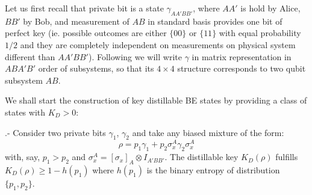\documentclass[twocolumn,prl,aps]{revtex4}
\begin{document}

Let us first recall that private bit \cite{keyhuge} is  a state 
$\gamma_{AA'BB'}$, where $AA'$ is hold by Alice, $BB'$ by Bob, 
and measurement of $AB$ in standard basis provides one bit of perfect key
(ie. possible outcomes are either $\{00\}$ or $\{11\}$
with equal probability $1/2$ and they are completely independent on
measurements on physical system different than $AA'BB'$).
Following \cite{keyhuge} we will write $\gamma$ in matrix representation in $ABA'B'$ order of subsystems, so that its $4\times 4$ structure corresponds to
two qubit subsystem $AB$. 

We shall start the construction of key distillable BE states by providing a class of states with $K_D>0$:

{\prop .- Consider two private bits $\gamma_{1}$, 
$\gamma_{2}$ and take any biased mixture of the form:
\begin{equation}
\rho= p_{1}\gamma_{1} + p_{2}\sigma^{A}_{x}\gamma_{2}\sigma^{A}_{x} 
\label{eq:rho-prop}
\end{equation}
with, say, $ p_{1} > p_{2} $ and 
$ \sigma^{A}_{x} = [\sigma_{x}]_{A} \otimes I_{A'BB'}$. 
The distillable key $K_D(\rho)$ fulfills $K_D(\rho) \geq 1- h(p_1)$
where $h(p_1)$ is the binary entropy of distribution $\{p_1, p_2\}$.
\label{prop:mixedpbits}
}
\end{document}
